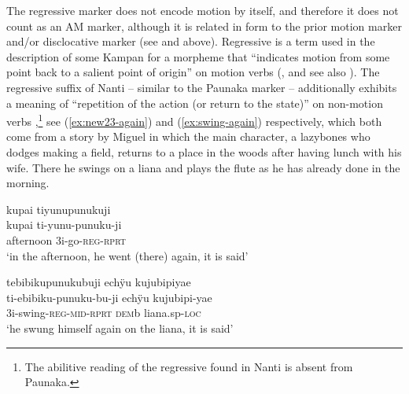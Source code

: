 The regressive marker does not encode motion by itself, and therefore it does not count as an AM marker, although it is related in form to the prior motion marker and/or disclocative marker (see  and  above). Regressive is a term used in the description of some Kampan  for a morpheme that “indicates motion from some point back to a salient point of origin” on motion verbs (\citealt[256]{Michael2008}, and see also \citealt[42]{Payne_et_al1982}). The regressive suffix of Nanti -- similar to the Paunaka marker -- additionally exhibits a meaning of “repetition of the action (or return to the state)” on non-motion verbs \citep[256]{Michael2008},\footnote{The abilitive reading of the regressive found in Nanti \citep[cf.][257]{Michael2008} is absent from Paunaka.} see (\ref{ex:new23-again}) and (\ref{ex:swing-again}) respectively, which both come from a story by Miguel in which the main character, a lazybones who dodges making a field, returns to a place in the woods after having lunch with his wife. There he swings on a liana and plays the flute as he has already done in the morning.

\ea\label{ex:new23-again}
\begingl
\glpreamble kupai tiyunupunukuji\\
\gla kupai ti-yunu-punuku-ji\\
\glb afternoon 3i-go-\textsc{reg}-\textsc{rprt}\\
\glft ‘in the afternoon, he went (there) again, it is said’
\endgl
\trailingcitation{[mox-n110920l.041]}
\xe

\ea\label{ex:swing-again}
\begingl 
\glpreamble tebibikupunukubuji echÿu kujubipiyae\\
\gla ti-ebibiku-punuku-bu-ji echÿu kujubipi-yae\\ 
\glb 3i-swing-\textsc{reg}-\textsc{mid}-\textsc{rprt} \textsc{dem}b liana.sp-\textsc{loc}\\ 
\glft ‘he swung himself again on the liana, it is said’\\ 
\endgl
\trailingcitation{[mox-n110920l.042]}
\xe

